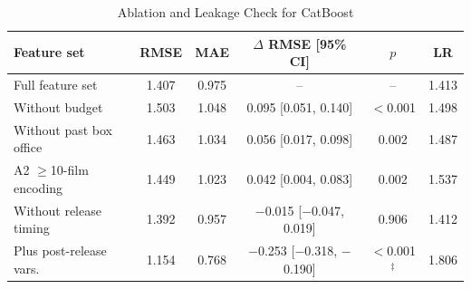 \begin{table}[!t]
\centering
\caption{Ablation and Leakage Check for CatBoost}
\label{tab:ablation}
\scriptsize
\setlength{\tabcolsep}{2.2pt}
\begin{tabular}{@{}lccccc@{}}
\toprule
Feature set & RMSE & MAE & $\Delta$ RMSE [95\% CI] & $p$ & LR \\
\midrule
Full feature set & 1.407 & 0.975 & -- & -- & 1.413 \\
Without budget & 1.503 & 1.048 & 0.095 [0.051, 0.140] & $<$0.001 & 1.498 \\
Without past box office & 1.463 & 1.034 & 0.056 [0.017, 0.098] & 0.002 & 1.487 \\
A2 $\geq$10-film encoding & 1.449 & 1.023 & 0.042 [0.004, 0.083] & 0.002 & 1.537 \\
Without release timing & 1.392 & 0.957 & $-$0.015 [$-$0.047, 0.019] & 0.906 & 1.412 \\
\midrule
Plus post-release vars. & 1.154 & 0.768 & $-$0.253 [$-$0.318, $-$0.190] & $<$0.001$^{\ddagger}$ & 1.806 \\
\bottomrule
\end{tabular}
\par{}
\end{table}
